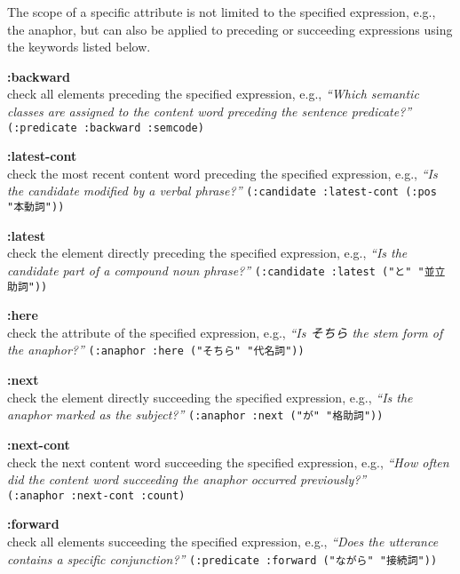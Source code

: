 \noindent
The scope of a specific attribute is not limited to the specified expression, e.g., the anaphor, but can also be applied to
preceding or succeeding expressions using the keywords listed below. \\

\begin{deflist}{}
 \item[{\bf :backward}] \hfill \\
   check all elements preceding the specified expression,
   e.g., {\em ``Which semantic classes are assigned to the content word preceding the sentence predicate?''} \\
         {\tt (:predicate :backward :semcode)}
 \item[{\bf :latest-cont}]  \hfill \\
   check the most recent content word preceding the specified expression,
   e.g., {\em ``Is the candidate modified by a verbal phrase?''} 
        {\tt (:candidate :latest-cont (:pos  "本動詞"))}
 \item[{\bf :latest}]  \hfill \\
   check the element directly preceding the specified expression,
   e.g., {\em ``Is the candidate part of a compound noun phrase?''}
        {\tt (:candidate :latest ("と" "並立助詞"))}
 \item[{\bf :here}]  \hfill \\
   check the attribute of the specified expression,
   e.g., {\em ``Is そちら the stem form of the anaphor?''} 
        {\tt (:anaphor :here ("そちら" "代名詞"))}
 \item[{\bf :next}]  \hfill \\
   check the element directly succeeding the specified expression,
   e.g., {\em ``Is the anaphor marked as the subject?''} 
        {\tt (:anaphor :next ("が" "格助詞"))}
 \item[{\bf :next-cont}]  \hfill \\
   check the next content word succeeding the specified expression,
   e.g., {\em ``How often did the content word succeeding the anaphor occurred previously?''} \\
        {\tt (:anaphor :next-cont :count)}
 \item[{\bf :forward}]   \hfill \\
   check all elements succeeding the specified expression, 
   e.g., {\em ``Does the utterance contains a specific conjunction?''}
        {\tt (:predicate :forward ("ながら" "接続詞"))}\\[-0.5em]
\end{deflist}

